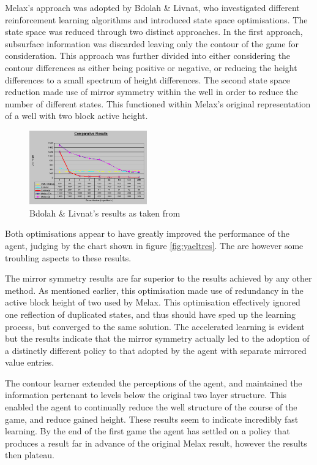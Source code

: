 \documentclass{rucsthesis}
\begin{document}
Melax's approach was adopted by Bdolah \& Livnat, who investigated different reinforcement learning algorithms and introduced state space optimisations. The state space was reduced through two distinct approaches. In the first approach, subsurface information was discarded leaving only the contour of the game for consideration. This approach was further divided into either considering the contour differences as either being positive or negative, or reducing the height differences to a small spectrum of height differences. The second state space reduction made use of mirror symmetry within the well in order to reduce the number of different states. This functioned within Melax's original representation of a well with two block active height.

\begin{figure}[h]
\centering
\includegraphics[width=2in]{results.png}
\caption{Bdolah \& Livnat's results as taken from \cite{yaeltetris}}
\label{fig:yaelres}
\end{figure}

Both optimisations appear to have greatly improved the performance of the agent, judging by the chart shown in figure \ref{fig:yaeltres}. The are however some troubling aspects to these results.

The mirror symmetry results are far superior to the results achieved by any other method. As mentioned earlier, this optimisation made use of redundancy in the active block height of two used by Melax. This optimisation effectively ignored one reflection of duplicated states, and thus should have sped up the learning process, but converged to the same solution. The accelerated learning is evident but the results indicate that the mirror symmetry actually led to the adoption of a distinctly different policy to that adopted by the agent with separate mirrored value entries.   

The contour learner extended the perceptions of the agent, and maintained the information pertenant to levels below the original two layer structure. This enabled the agent to continually reduce the well structure of the course of the game, and reduce gained height. These results seem to indicate incredibly fast learning. By the end of the first game the agent has settled on a policy that produces a result far in advance of the original Melax result, however the results then plateau. 
\end{document}
